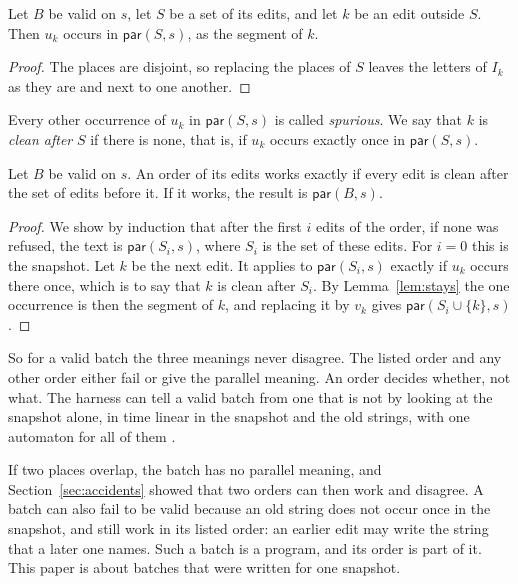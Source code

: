 \documentclass[acmsmall,nonacm,screen]{acmart}
\newcommand{\kw}[1]{\mathsf{#1}}
\newcommand{\Par}{\kw{par}}
\begin{document}
\begin{lemma}\label{lem:stays}
Let $B$ be valid on $s$, let $S$ be a set of its edits, and let $k$ be an edit outside $S$.
Then $u_k$ occurs in $\Par(S, s)$, as the segment of $k$.
\end{lemma}

\begin{proof}
The places are disjoint, so replacing the places of $S$ leaves the letters of $I_k$ as they
are and next to one another.
\end{proof}

Every other occurrence of $u_k$ in $\Par(S, s)$ is called \emph{spurious}. We say that $k$ is
\emph{clean after} $S$ if there is none, that is, if $u_k$ occurs exactly once in
$\Par(S, s)$.

\begin{theorem}\label{thm:one}
Let $B$ be valid on $s$. An order of its edits works exactly if every edit is clean after the
set of edits before it. If it works, the result is $\Par(B, s)$.
\end{theorem}

\begin{proof}
We show by induction that after the first $i$ edits of the order, if none was refused, the
text is $\Par(S_i, s)$, where $S_i$ is the set of these edits. For $i = 0$ this is the
snapshot. Let $k$ be the next edit. It applies to $\Par(S_i, s)$ exactly if $u_k$ occurs
there once, which is to say that $k$ is clean after $S_i$. By Lemma~\ref{lem:stays} the one
occurrence is then the segment of $k$, and replacing it by $v_k$ gives $\Par(S_i \cup \{k\},
s)$.
\end{proof}

So for a valid batch the three meanings never disagree. The listed order and any other order
either fail or give the parallel meaning. An order decides whether, not what. The harness can
tell a valid batch from one that is not by looking at the snapshot alone, in time linear in
the snapshot and the old strings, with one automaton for all of them \citep{AhoCorasick1975}.

If two places overlap, the batch has no parallel meaning, and Section~\ref{sec:accidents}
showed that two orders can then work and disagree. A batch can also fail to be valid because
an old string does not occur once in the snapshot, and still work in its listed order: an
earlier edit may write the string that a later one names. Such a batch is a program, and its
order is part of it. This paper is about batches that were written for one snapshot.
\end{document}
